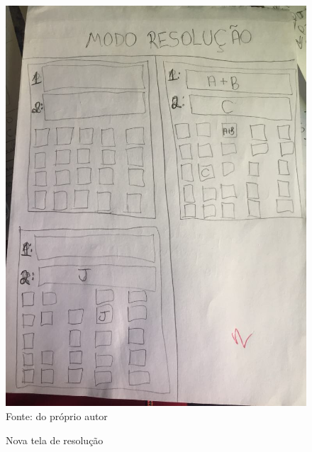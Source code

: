 \begin{figure}[H]
\centering
\caption{Nova tela de resolução}
\includegraphics[scale=0.13]{figuras/prot3.jpg}
\label{prot3}
\\
\small{Fonte: do próprio autor}
\end{figure}


